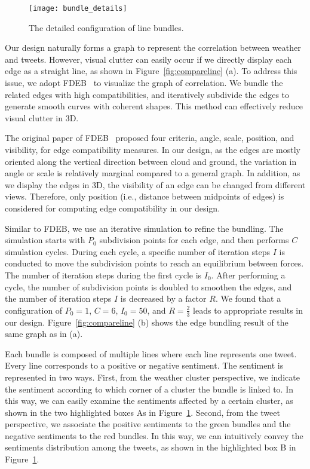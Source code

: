 \begin{figure}[t]
\begin{center}
\texttt{[image: bundle\_details]}
\end{center}
\vspace{-.1in}
\caption{The detailed configuration of line bundles.}
\label{fig:linedetail}
\end{figure}

Our design naturally forms a graph to represent the correlation between weather and tweets. However, visual clutter can easily occur if we directly display each edge as a straight line, as shown in Figure~\ref{fig:compareline} (a).
%
To address this issue, we adopt FDEB~\cite{holten2009force} to visualize the graph of correlation. We bundle the related edges with high compatibilities, and iteratively subdivide the edges to generate smooth curves with coherent shapes. This method can effectively reduce visual clutter in 3D.

The original paper of FDEB~\cite{holten2009force} proposed four criteria, angle, scale, position, and visibility, for edge compatibility measures. In our design, as the edges are mostly oriented along the vertical direction between cloud and ground, the variation in angle or scale is relatively marginal compared to a general graph. In addition, as we display the edges in 3D, the visibility of an edge can be changed from different views. Therefore, only position (i.e., distance between midpoints of edges) is considered for computing edge compatibility in our design.

Similar to FDEB, we use an iterative simulation to refine the bundling. The simulation starts with $P_0$ subdivision points for each edge, and then performs $C$ simulation cycles. During each cycle, a specific number of iteration steps $I$ is conducted to move the subdivision points to reach an equilibrium between forces. The number of iteration steps during the first cycle is $I_0$. After performing a cycle, the number of subdivision points is doubled to smoothen the edges, and the number of iteration steps $I$ is decreased by a factor $R$. We found that a configuration of $P_0=1$, $C=6$, $I_0=50$, and $R=\frac{2}{3}$ leads to appropriate results in our design. Figure~\ref{fig:compareline} (b) shows the edge bundling result of the same graph as in (a).

Each bundle is composed of multiple lines where each line represents one tweet. Every line corresponds to a positive or negative sentiment. The sentiment is represented in two ways. First, from the weather cluster perspective, we indicate the sentiment according to which corner of a cluster the bundle is linked to. In this way, we can easily examine the sentiments affected by a certain cluster, as shown in the two highlighted boxes As in Figure~\ref{fig:linedetail}. Second, from the tweet perspective, we associate the positive sentiments to the green bundles and the negative sentiments to the red bundles. In this way, we can intuitively convey the sentiments distribution among the tweets, as shown in the highlighted box B in Figure~\ref{fig:linedetail}.

